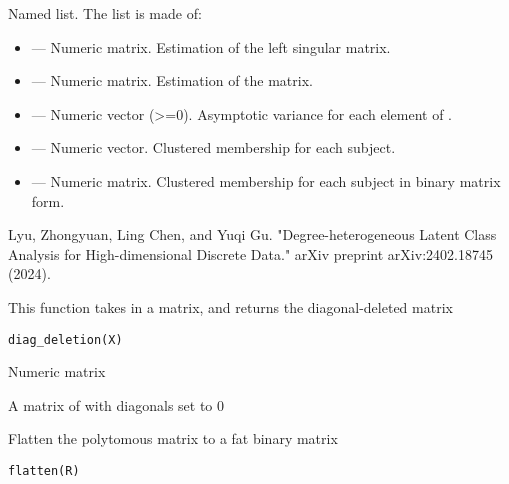 \documentclass[a4paper]{book}
\begin{document}
\begin{Value}
Named list. The list is made of:
\begin{itemize}

\item{}  --- Numeric matrix. Estimation of the left singular matrix.
\item{}  --- Numeric matrix. Estimation of the \eqn{\Theta}{} matrix.
\item{}  --- Numeric vector (>=0). Asymptotic variance for each element of .
\item{}  --- Numeric vector. Clustered membership for each subject.
\item{}  --- Numeric matrix. Clustered membership for each subject in binary matrix form.

\end{itemize}

\end{Value}
%
\begin{References}
Lyu, Zhongyuan, Ling Chen, and Yuqi Gu. "Degree-heterogeneous Latent Class Analysis for High-dimensional Discrete Data." arXiv preprint arXiv:2402.18745 (2024).
\end{References}
%
\begin{Description}
This function takes in a matrix, and returns the diagonal-deleted matrix
\end{Description}
%
\begin{Usage}
\begin{verbatim}
diag_deletion(X)
\end{verbatim}
\end{Usage}
%
\begin{Arguments}
\begin{ldescription}
\item[\code{X}] Numeric matrix
\end{ldescription}
\end{Arguments}
%
\begin{Value}
A matrix of with diagonals set to 0
\end{Value}
%
\begin{Description}
Flatten the polytomous matrix to a fat binary matrix
\end{Description}
%
\begin{Usage}
\begin{verbatim}
flatten(R)
\end{verbatim}
\end{Usage}
\end{document}
